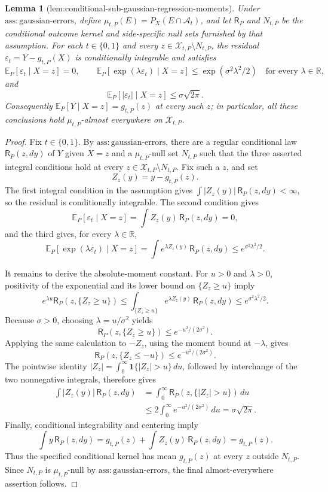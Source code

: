 \documentclass{article}
\newtheorem{lemma}{Lemma}
\begin{document}
\begin{lemma}[lem:conditional-sub-gaussian-regression-moments]\label{lem:conditional-sub-gaussian-regression-moments}
Under \(\mathrm{ass:gaussian\text{-}errors}\), define \(\mu_{t,P}(E)=P_X(E\cap\mathcal A_t)\), and let \(\mathsf R_P\) and \(N_{t,P}\) be the conditional outcome kernel and side-specific null sets furnished by that assumption. For each \(t\in\{0,1\}\) and every \(z\in\mathcal X_{t,P}\setminus N_{t,P}\), the residual \(\varepsilon_t=Y-g_{t,P}(X)\) is conditionally integrable and satisfies
\[
 \mathbb E_P[\varepsilon_t\mid X=z]=0,\qquad
 \mathbb E_P[\exp(\lambda\varepsilon_t)\mid X=z]\le \exp(\sigma^2\lambda^2/2)\quad\text{for every }\lambda\in\mathbb R,
\]
and
\[
 \mathbb E_P[|\varepsilon_t|\mid X=z]\le \sigma\sqrt{2\pi}.
\]
Consequently \(\mathbb E_P[Y\mid X=z]=g_{t,P}(z)\) at every such \(z\); in particular, all these conclusions hold \(\mu_{t,P}\)-almost everywhere on \(\mathcal X_{t,P}\).
\end{lemma}
\begin{proof}
Fix \(t\in\{0,1\}\). By \(\mathrm{ass:gaussian\text{-}errors}\), there are a regular conditional law \(\mathsf R_P(z,dy)\) of \(Y\) given \(X=z\) and a \(\mu_{t,P}\)-null set \(N_{t,P}\) such that the three asserted integral conditions hold at every \(z\in\mathcal X_{t,P}\setminus N_{t,P}\). Fix such a \(z\), and set
\[
 Z_z(y)=y-g_{t,P}(z).
\]
The first integral condition in the assumption gives \(\int |Z_z(y)|\,\mathsf R_P(z,dy)<\infty\), so the residual is conditionally integrable. The second condition gives
\[
 \mathbb E_P[\varepsilon_t\mid X=z]
 =\int Z_z(y)\,\mathsf R_P(z,dy)=0,
\]
and the third gives, for every \(\lambda\in\mathbb R\),
\[
 \mathbb E_P[\exp(\lambda\varepsilon_t)\mid X=z]
 =\int e^{\lambda Z_z(y)}\,\mathsf R_P(z,dy)
 \le e^{\sigma^2\lambda^2/2}.
\]

It remains to derive the absolute-moment constant. For \(u>0\) and \(\lambda>0\), positivity of the exponential and its lower bound on \(\{Z_z\ge u\}\) imply
\[
 e^{\lambda u}\mathsf R_P(z,\{Z_z\ge u\})
 \le \int_{\{Z_z\ge u\}}e^{\lambda Z_z(y)}\,\mathsf R_P(z,dy)
 \le e^{\sigma^2\lambda^2/2}.
\]
Because \(\sigma>0\), choosing \(\lambda=u/\sigma^2\) yields
\[
 \mathsf R_P(z,\{Z_z\ge u\})\le e^{-u^2/(2\sigma^2)}.
\]
Applying the same calculation to \(-Z_z\), using the moment bound at \(-\lambda\), gives
\[
 \mathsf R_P(z,\{Z_z\le-u\})\le e^{-u^2/(2\sigma^2)}.
\]
The pointwise identity \(|Z_z|=\int_0^\infty\mathbf 1\{|Z_z|>u\}\,du\), followed by interchange of the two nonnegative integrals, therefore gives
\[
\begin{aligned}
 \int |Z_z(y)|\,\mathsf R_P(z,dy)
 &=\int_0^\infty \mathsf R_P(z,\{|Z_z|>u\})\,du\\
 &\le 2\int_0^\infty e^{-u^2/(2\sigma^2)}\,du
 =\sigma\sqrt{2\pi}.
\end{aligned}
\]
Finally, conditional integrability and centering imply
\[
 \int y\,\mathsf R_P(z,dy)
 =g_{t,P}(z)+\int Z_z(y)\,\mathsf R_P(z,dy)
 =g_{t,P}(z).
\]
Thus the specified conditional kernel has mean \(g_{t,P}(z)\) at every \(z\) outside \(N_{t,P}\). Since \(N_{t,P}\) is \(\mu_{t,P}\)-null by \(\mathrm{ass:gaussian\text{-}errors}\), the final almost-everywhere assertion follows.
\end{proof}
\end{document}
